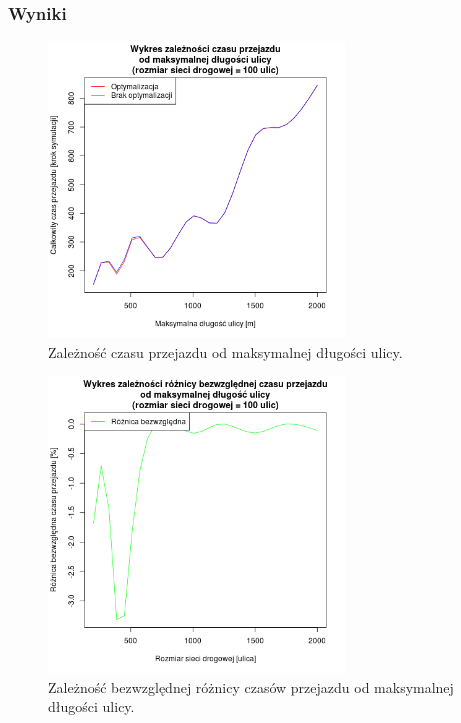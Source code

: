 \documentclass[11pt,a4paper]{article}
\begin{document}
\subsubsection{Wyniki}



\begin{figure}[H]
	\centering
		\includegraphics[width=0.7\textwidth]{../images/simulation6}
	\caption{Zależność czasu przejazdu od maksymalnej długości ulicy.}
\end{figure}

\begin{figure}[H]
	\centering
		\includegraphics[width=0.7\textwidth]{../images/simulation6_diff}
	\caption{Zależność bezwzględnej różnicy czasów przejazdu od maksymalnej długości ulicy.}
\end{figure}
\end{document}
